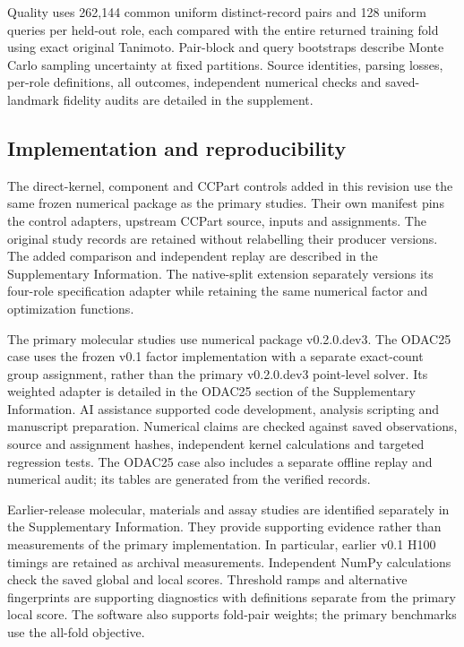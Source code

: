 \documentclass[12pt]{article}
\begin{document}
Quality uses 262,144 common uniform distinct-record pairs and 128 uniform
queries per held-out role, each compared with the entire returned training
fold using exact original Tanimoto. Pair-block and query bootstraps describe
Monte Carlo sampling uncertainty at fixed partitions. Source identities,
parsing losses, per-role definitions, all outcomes, independent numerical checks
and saved-landmark fidelity audits are detailed in the supplement.

\subsection{Implementation and reproducibility}

The direct-kernel, component and CCPart controls added in this revision use
the same frozen numerical package as the primary studies. Their own manifest
pins the control adapters, upstream CCPart source, inputs and assignments.
The original study records are retained without relabelling their producer
versions. The added comparison and independent replay are described in the
Supplementary Information.
The native-split extension separately versions its four-role specification
adapter while retaining the same numerical factor and optimization functions.

The primary molecular studies use numerical package v0.2.0.dev3. The
ODAC25 case uses the frozen v0.1 factor implementation with a separate
exact-count group assignment, rather than the primary v0.2.0.dev3 point-level
solver. Its weighted adapter is detailed in the ODAC25 section of the
Supplementary Information. AI assistance supported code development, analysis
scripting and manuscript preparation. Numerical claims are checked against
saved observations, source and assignment hashes, independent kernel
calculations and targeted regression tests. The ODAC25 case also includes a
separate offline replay and numerical audit; its tables are generated from the
verified records.

Earlier-release molecular, materials and assay studies are identified
separately in the Supplementary Information. They provide supporting evidence
rather than measurements of the primary implementation. In particular, earlier
v0.1 H100 timings are retained as archival measurements. Independent NumPy
calculations check the saved global and local scores. Threshold ramps and
alternative fingerprints are supporting diagnostics with definitions separate
from the primary local score. The software also supports fold-pair weights; the
primary benchmarks use the all-fold objective.
\end{document}
